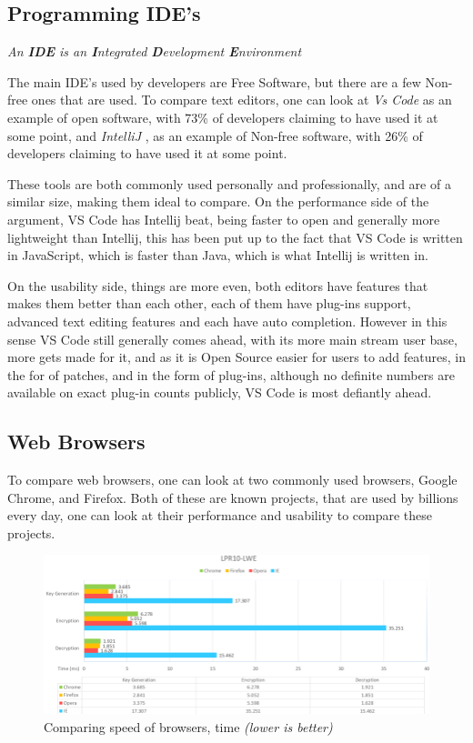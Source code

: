 \documentclass[a4paper,12pt]{article}
\begin{document}
{\subsection{Programming IDE's}
\textit{An \textbf{IDE} is an \textbf{I}ntegrated \textbf{D}evelopment \textbf{E}nvironment}

The main IDE's used by developers are Free Software, but there are a few Non-free ones that are used.
To compare text editors, one can look at \textit{Vs Code} as an example of open software, with 73\% of 
developers claiming to have used it at some point, and \textit{IntelliJ} , as an example of Non-free 
software, with 26\% of developers claiming to have used it at some point\cite{IDEusage}.

These tools are both commonly used personally and professionally, and are of a similar size, making them
ideal to compare. On the performance side of the argument, VS Code has Intellij beat, being faster to open
and generally more lightweight than Intellij, this has been put up to the fact that VS Code is written in 
JavaScript, which is faster than Java, which is what Intellij is written in\cite{VSCODEvsintellij}.

On the usability side, things are more even, both editors have features that makes them better than each other,
each of them have plug-ins support, advanced text editing features and each have auto completion. However in this
sense VS Code still generally comes ahead, with its more main stream user base, more gets made for it, and as
it is Open Source easier for users to add features, in the for of patches, and in the form of plug-ins, although
no definite numbers are available on exact plug-in counts publicly, VS Code is most defiantly ahead.

\subsection{Web Browsers}
To compare web browsers, one can look at two commonly used browsers, Google Chrome, and Firefox. Both of these
are known projects, that are used by billions every day, one can look at their performance and usability to compare
these projects. 

\begin{figure}[h]
	\caption{Comparing speed of browsers, time \textit{(lower is better)}}
	\includegraphics[width=\textwidth]{webbrowserperfomace.png}
\end{figure}

}
\end{document}
